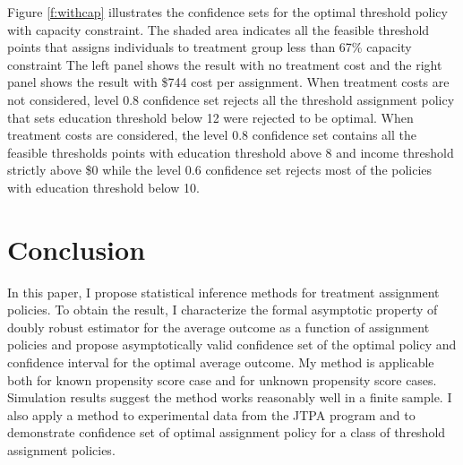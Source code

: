\documentclass[12pt,oneside,reqno,english]{amsart}
\theoremstyle{definition}
\begin{document}
Figure \ref{f:withcap} illustrates the confidence sets for the optimal threshold policy with capacity constraint. 
The shaded area indicates all the feasible threshold points that assigns individuals to treatment group less than 67\% capacity constraint
The left panel shows the result with no treatment cost and the right panel shows the result with \$744 cost per assignment. 
When treatment costs are not considered, level 0.8 confidence set rejects 
all the threshold assignment policy that sets education threshold below 12 were rejected to be optimal.
When treatment costs are considered, the level $0.8$ confidence set contains all the feasible thresholds points with education threshold above 8 and income threshold strictly above \$0 while the level $0.6$ confidence set rejects most of the policies with education threshold below 10. 


\section{Conclusion}
In this paper, I propose statistical inference methods for treatment assignment policies.  
To obtain the result, I characterize the formal asymptotic property of doubly robust estimator for the average outcome as a function of assignment policies and propose 
asymptotically valid confidence set of the optimal policy and confidence interval for the optimal average outcome. My method is applicable both for
 known propensity score case and for unknown propensity score cases. Simulation results suggest the method works reasonably well in a finite sample. 
I also apply a method to experimental data from the JTPA program and to demonstrate confidence set of optimal assignment policy for a class of threshold assignment policies. 
\newpage
\appendix
\end{document}
